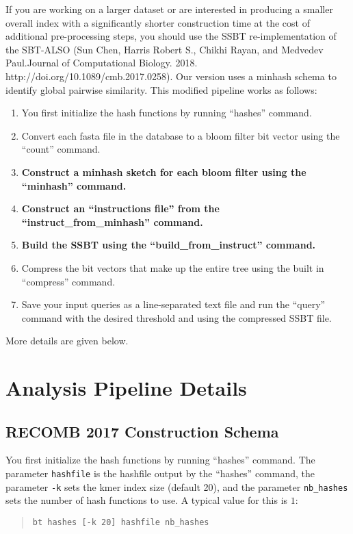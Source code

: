 \documentclass{article}
\begin{document}
If you are working on a larger dataset or are interested in producing a smaller overall index with a significantly shorter construction time at the cost of additional pre-processing steps, you should use the SSBT re-implementation of the SBT-ALSO (Sun Chen, Harris Robert S., Chikhi Rayan, and Medvedev Paul.Journal of Computational Biology. 2018. http://doi.org/10.1089/cmb.2017.0258). Our version uses a minhash schema to identify global pairwise similarity. This modified pipeline works as follows:
\begin{enumerate}
\item You first initialize the hash functions by running ``hashes'' command. 
\item Convert each fasta file in the database to a bloom filter bit vector using the  ``count'' command. 
\item \textbf{Construct a minhash sketch for each bloom filter using the ``minhash'' command.}
\item \textbf{Construct an ``instructions file'' from the ``instruct\_from\_minhash'' command.}
\item \textbf{Build the SSBT using the ``build\_from\_instruct'' command.}
\item Compress the bit vectors that make up the entire tree using the built in ``compress'' command.
\item Save your input queries as a line-separated text file and run the ``query'' command with the desired threshold and using the compressed SSBT file.
\end{enumerate}
More details are given below.

\section{Analysis Pipeline Details}

\subsection{RECOMB 2017 Construction Schema}

You first initialize the hash functions by running ``hashes'' command. The parameter \verb+hashfile+ is the hashfile output by the ``hashes'' command, the parameter \verb+-k+ sets the kmer index size (default 20), and the parameter \verb+nb_hashes+ sets the number of hash functions to use. A typical value for this is $1$:
%
\begin{quote}
\begin{verbatim}
bt hashes [-k 20] hashfile nb_hashes
\end{verbatim}
\end{quote}
\end{document}
